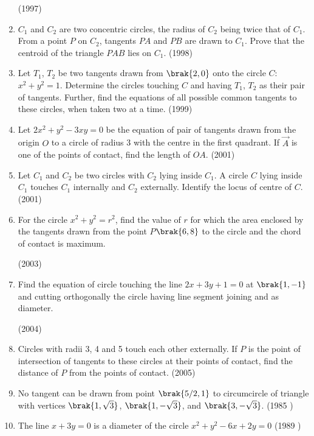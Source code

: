 \begin{enumerate}
\hfill(1997)




\item $C_{1}$ and $C_{2}$ are two concentric circles,  the radius of $C_{2}$ being twice that of $C_{1}$. From a point $P$ on $C_{2}$,  tangents $PA$ and $PB$ are drawn to $C_{1}$. Prove that the centroid of the triangle $PAB$ lies on $C_{1}$.
	           \hfill(1998)




\item Let $T_{1}$,  $T_{2}$ be two tangents drawn from $\brak{2, 0}$ onto the circle $C$:$x^2+y^2=1$. Determine the circles touching $C$ and having $T_{1}$,  $T_{2}$ as their pair of tangents. Further,  find the equations of all possible common tangents to these circles,  when taken two at a time.
                  \hfill(1999)




\item Let $2x^2+y^2-3xy=0$ be the equation of pair of tangents drawn from the origin $O$ to a circle of radius 3 with the centre in the first quadrant. If $\vec{A}$ is one of the points of contact,  find the length of $OA$.                   \hfill(2001)




\item Let $C_{1}$ and $C_{2}$ be two circles with $C_{2}$ lying inside $C_{1}$. A circle $C$ lying inside $C_{1}$ touches $C_{1}$ internally and $C_{2}$ externally. Identify the locus of centre of $C$.                                \hfill(2001)



\item For the circle $x^2+y^2=r^2$,  find the value of $r$ for which the area enclosed by the tangents drawn from the point $P$$\brak{6, 8}$ to the circle and the chord of contact is maximum.


\hfill(2003) 





\item Find the equation of circle touching the line $2x+3y+1=0$ at $\brak{1, -1}$ and cutting orthogonally the circle having line segment joining  and  as diameter.


\hfill(2004)     




\item Circles with radii 3, 4 and 5 touch each other externally. If $P$ is the point of intersection of tangents to these circles at their points of contact,  find the distance of $P$ from the points of contact.
	           \hfill(2005) 
    \item No tangent can be drawn from point $\brak{5/2,  1}$ to circumcircle of triangle with vertices $\brak{1,  \sqrt{3}}$,  $\brak{1,  -\sqrt{3}}$,  and $\brak{3,  -\sqrt{3}}$.
    \hfill{(1985 )}
    \item The line $x+3y = 0$ is a diameter of the circle $ x^{2} + y^{2} - 6x +2y = 0$
    \hfill{(1989 )}


\end{enumerate}
